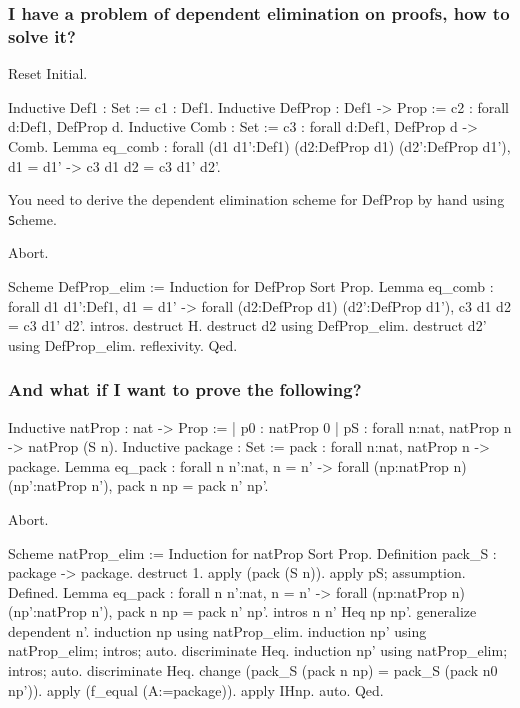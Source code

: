 \documentclass[a4paper,pdftex]{article}
\def\Question#1{\stepcounter{question}\subsubsection{#1}}
\newcommand{\coqtt}[1]{{\tt #1}}
\begin{document}
\Question{I have a problem of dependent elimination on
proofs, how to solve it?}

\begin{coq_eval}
Reset Initial.
\end{coq_eval}

\begin{coq_example*}
Inductive Def1 : Set := c1 : Def1.
Inductive DefProp : Def1 -> Prop :=
  c2 : forall d:Def1, DefProp d.
Inductive Comb : Set :=
  c3 : forall d:Def1, DefProp d -> Comb.
Lemma eq_comb :
  forall (d1 d1':Def1) (d2:DefProp d1) (d2':DefProp d1'),
    d1 = d1' -> c3 d1 d2 = c3 d1' d2'.
\end{coq_example*}

 You need to derive the dependent elimination
scheme for DefProp by hand using {\coqtt Scheme}.

\begin{coq_eval}
Abort.
\end{coq_eval}

\begin{coq_example*}
Scheme DefProp_elim := Induction for DefProp Sort Prop.
Lemma eq_comb :
  forall d1 d1':Def1,
    d1 = d1' ->
    forall (d2:DefProp d1) (d2':DefProp d1'), c3 d1 d2 = c3 d1' d2'.
intros.
destruct H.
destruct d2 using DefProp_elim.
destruct d2' using DefProp_elim.
reflexivity.
Qed.
\end{coq_example*}


\Question{And what if I want to prove the following?}

\begin{coq_example*}
Inductive natProp : nat -> Prop :=
  | p0 : natProp 0
  | pS : forall n:nat, natProp n -> natProp (S n).
Inductive package : Set :=
  pack : forall n:nat, natProp n -> package.
Lemma eq_pack :
 forall n n':nat,
   n = n' ->
   forall (np:natProp n) (np':natProp n'), pack n np = pack n' np'.
\end{coq_example*}



\begin{coq_eval}
Abort.
\end{coq_eval}
\begin{coq_example*}
Scheme natProp_elim := Induction for natProp Sort Prop.
Definition pack_S : package -> package.
destruct 1.
apply (pack (S n)).
apply pS; assumption.
Defined.
Lemma eq_pack :
  forall n n':nat,
    n = n' ->
    forall (np:natProp n) (np':natProp n'), pack n np = pack n' np'.
intros n n' Heq np np'.
generalize dependent n'.
induction np using natProp_elim.
induction np' using natProp_elim; intros; auto.
 discriminate Heq.
induction np' using natProp_elim; intros; auto.
 discriminate Heq.
change (pack_S (pack n np) = pack_S (pack n0 np')).
apply (f_equal (A:=package)).
apply IHnp.
auto.
Qed.
\end{coq_example*}
\end{document}
